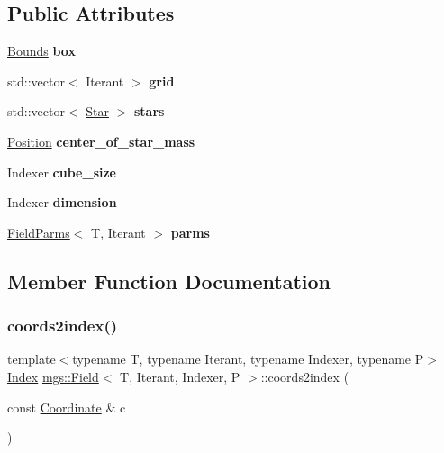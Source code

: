 \subsection*{Public Attributes}
\begin{DoxyCompactItemize}
\item 
\mbox{\label{structmgs_1_1Field_a3bf519b1216e7019388596b18dc849f5}} 
\hyperlink{structmgs_1_1Bounds}{Bounds} {\bfseries box}
\item 
\mbox{\label{structmgs_1_1Field_a19d761209af98bb8e3442e0c9dd25892}} 
std\+::vector$<$ Iterant $>$ {\bfseries grid}
\item 
\mbox{\label{structmgs_1_1Field_a649eeb6b7f87055cbf6b8d6d60cbcee0}} 
std\+::vector$<$ \hyperlink{structmgs_1_1Star}{Star} $>$ {\bfseries stars}
\item 
\mbox{\label{structmgs_1_1Field_a9a8507137a87e214e33f256cfebc7ce6}} 
\hyperlink{structmgs_1_1Vector}{Position} {\bfseries center\+\_\+of\+\_\+star\+\_\+mass}
\item 
\mbox{\label{structmgs_1_1Field_a43157fc61030c1eeffe39192fe8a25b2}} 
Indexer {\bfseries cube\+\_\+size}
\item 
\mbox{\label{structmgs_1_1Field_a6d56d193bdc368d461f55a58069cacca}} 
Indexer {\bfseries dimension}
\item 
\mbox{\label{structmgs_1_1Field_a69de199e9544dd7839ffd5d272fd5982}} 
\hyperlink{structmgs_1_1FieldParms}{Field\+Parms}$<$ T, Iterant $>$ {\bfseries parms}
\end{DoxyCompactItemize}


\subsection{Member Function Documentation}
\mbox{\label{structmgs_1_1Field_ae10cc38826982adfbf9ef8df7b9bf5bd}} 
\subsubsection{\texorpdfstring{coords2index()}{coords2index()}}
{\footnotesize\ttfamily template$<$typename T, typename Iterant, typename Indexer, typename P$>$ \\
\hyperlink{structmgs_1_1Index}{Index} \hyperlink{structmgs_1_1Field}{mgs\+::\+Field}$<$ T, Iterant, Indexer, P $>$\+::coords2index (\begin{DoxyParamCaption}\item[{const \hyperlink{structmgs_1_1Vector}{Coordinate} \&}]{c }\end{DoxyParamCaption})\hspace{0.3cm}{\ttfamily [inline]}}

